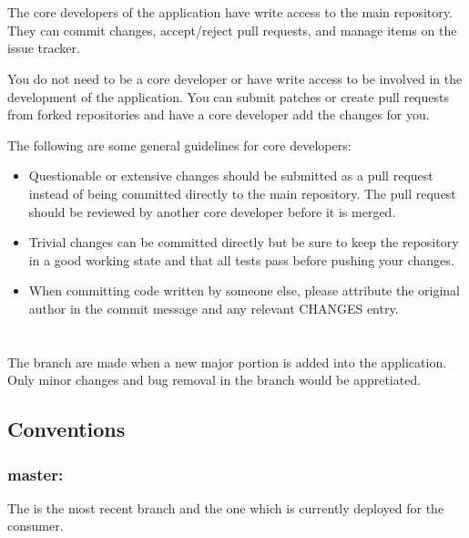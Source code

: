 \documentclass[letterpaper,10pt,english]{sphinxmanual}
\begin{document}
\section{}
\label{\detokenize{developer:core-developers}}
The core developers of the application have write access to the main repository. They can commit changes, accept/reject pull requests, and manage items on the issue tracker.

You do not need to be a core developer or have write access to be involved in the development of the application. You can submit patches or create pull requests from forked repositories and have a core developer add the changes for you.

The following are some general guidelines for core developers:
\begin{itemize}
\item {} 
Questionable or extensive changes should be submitted as a pull request instead of being committed directly to the main repository. The pull request should be reviewed by another core developer before it is merged.

\item {} 
Trivial changes can be committed directly but be sure to keep the repository in a good working state and that all tests pass before pushing your changes.

\item {} 
When committing code written by someone else, please attribute the original author in the commit message and any relevant CHANGES entry.

\end{itemize}


\section{}
\label{\detokenize{developer:branch-model}}
The branch are made when a new major portion is added into the application. Only minor changes and bug removal in the branch would be appretiated.


\subsection{Conventions}
\label{\detokenize{developer:conventions}}

\subsubsection{master:}
\label{\detokenize{developer:master}}
The is the most recent branch and the one which is currently deployed for the consumer.
\end{document}
